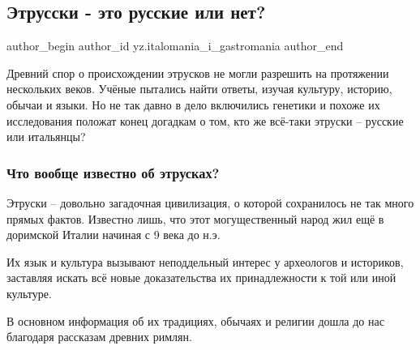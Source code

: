  
 
 
 
 
 
\subsection{Этрусски - это русские или нет?}
\label{sec:19_01_2022.yz.italomania_i_gastromania.1.etruski_russkie}
 
\ifcmt
 author_begin
   author_id yz.italomania_i_gastromania
 author_end
\fi

Древний спор о происхождении этрусков не могли разрешить на протяжении
нескольких веков. Учёные пытались найти ответы, изучая культуру, историю,
обычаи и языки. Но не так давно в дело включились генетики и похоже их
исследования положат конец догадкам о том, кто же всё-таки этруски – русские
или итальянцы?


\subsubsection{Что вообще известно об этрусках?}

Этруски – довольно загадочная цивилизация, о которой сохранилось не так много
прямых фактов. Известно лишь, что этот могущественный народ жил ещё в доримской
Италии начиная с 9 века до н.э.

Их язык и культура вызывают неподдельный интерес у археологов и историков,
заставляя искать всё новые доказательства их принадлежности к той или иной
культуре.


\begin{zznagolos}
В основном информация об их традициях, обычаях и религии дошла до нас благодаря
рассказам древних римлян.
\end{zznagolos}

